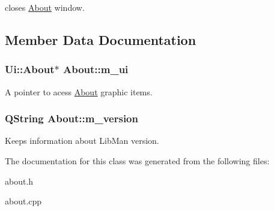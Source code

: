 closes \hyperlink{classAbout}{About} window. 



 

\subsection{Member Data Documentation}
\hypertarget{classAbout_a2ed1b138dc203e50d03c7a27964a1775}{
\subsubsection[{m\-\_\-ui}]{\setlength{\rightskip}{0pt plus 5cm}Ui\-::\-About$\ast$ About\-::m\-\_\-ui\hspace{0.3cm}{\ttfamily [private]}}}\label{classAbout_a2ed1b138dc203e50d03c7a27964a1775}
A pointer to acess \hyperlink{classAbout}{About} graphic items. \hypertarget{classAbout_a878ee376be90c7196e05259f7abdeae2}{
\subsubsection[{m\-\_\-version}]{\setlength{\rightskip}{0pt plus 5cm}Q\-String About\-::m\-\_\-version\hspace{0.3cm}{\ttfamily [private]}}}\label{classAbout_a878ee376be90c7196e05259f7abdeae2}
Keeps information about Lib\-Man version. 

The documentation for this class was generated from the following files\-:\begin{DoxyCompactItemize}
\item 
about.\-h\item 
about.\-cpp\end{DoxyCompactItemize}
